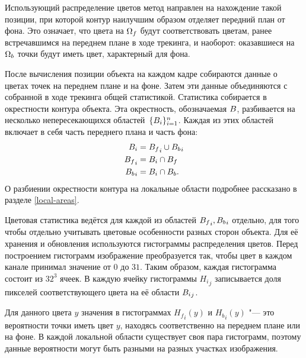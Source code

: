 
\newcommand{\Hf}{\ensuremath{H_f}}
\newcommand{\Hb}{\ensuremath{H_b}}
\newcommand{\uvec}{\ensuremath{\vect{u}}}
\newcommand{\xvec}{\ensuremath{\vect{x}}}
\newcommand{\hedist}{\ensuremath{\HeX{\CDistX{\uvec}}}}
\newcommand{\HistLocal}{\ensuremath{H_i}}
\newcommand{\HistLocalFg}{\ensuremath{{\Hf}_i}}
\newcommand{\HistLocalBg}{\ensuremath{{\Hb}_i}}

Использующий распределение цветов метод направлен на нахождение такой
позиции, при которой контур наилучшим образом отделяет передний план от фона.
Это означает, что цвета на $\Omega_f$ будут соответствовать цветам,
ранее встречавшимся на переднем плане в ходе трекинга, и наоборот:
оказавшиеся на $\Omega_b$ точки будут иметь цвет, характерный для фона.

После вычисления позиции объекта на каждом кадре собираются данные о цветах
точек на переднем плане и на фоне.
Затем эти данные объединяются с собранной в ходе трекинга общей статистикой.
Статистика собирается в окрестности контура объекта.
Эта окрестность, обозначаемая $B$, разбивается на несколько
непересекающихся областей~$\{B_i\}_{i = 1}^n$.
Каждая из этих областей включает в себя часть переднего плана и часть фона:
\begin{align}
\label{eqn:histo_partitioning}
    B_i &= {B_f}_i \cup {\ensuremath{B_b}}_i \\
    {B_f}_i &= B_i \cap B_f \\
    {B_b}_i &= B_i \cap B_b
\text{.}
\end{align}
О разбиении окрестности контура на локальные области подробнее рассказано в
разделе \ref{local-areas}.

Цветовая статистика ведётся для каждой из областей ${B_f}_i,
{B_b}_i$ отдельно, для того чтобы отдельно учитывать цветовые
особенности разных сторон объекта.
Для её хранения и обновления используются гистограммы распределения цветов.
Перед построением гистограмм изображение преобразуется так, чтобы цвет в каждом
канале принимал значение от $0$ до $31$.
Таким образом, каждая гистограмма состоит из $32^3$ ячеек.
В каждую ячейку гистограммы ${\HistLocal}_j$ записывается доля пикселей
соответствующего цвета на её области ${B_i}_j$.

Для данного цвета $y$ значения в гистограммах $\HistLocalFg(y)$ и
$\HistLocalBg(y)$ "--- это вероятности точки иметь цвет $y$, находясь
соответственно на переднем плане или на фоне.
В каждой локальной области существует своя пара гистограмм, поэтому
данные вероятности могут быть разными на разных участках изображения.

